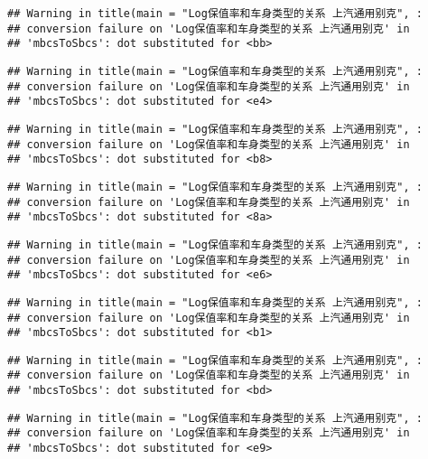 \documentclass[]{article}
\begin{document}
\begin{verbatim}
## Warning in title(main = "Log保值率和车身类型的关系 上汽通用别克", :
## conversion failure on 'Log保值率和车身类型的关系 上汽通用别克' in
## 'mbcsToSbcs': dot substituted for <bb>
\end{verbatim}

\begin{verbatim}
## Warning in title(main = "Log保值率和车身类型的关系 上汽通用别克", :
## conversion failure on 'Log保值率和车身类型的关系 上汽通用别克' in
## 'mbcsToSbcs': dot substituted for <e4>
\end{verbatim}

\begin{verbatim}
## Warning in title(main = "Log保值率和车身类型的关系 上汽通用别克", :
## conversion failure on 'Log保值率和车身类型的关系 上汽通用别克' in
## 'mbcsToSbcs': dot substituted for <b8>
\end{verbatim}

\begin{verbatim}
## Warning in title(main = "Log保值率和车身类型的关系 上汽通用别克", :
## conversion failure on 'Log保值率和车身类型的关系 上汽通用别克' in
## 'mbcsToSbcs': dot substituted for <8a>
\end{verbatim}

\begin{verbatim}
## Warning in title(main = "Log保值率和车身类型的关系 上汽通用别克", :
## conversion failure on 'Log保值率和车身类型的关系 上汽通用别克' in
## 'mbcsToSbcs': dot substituted for <e6>
\end{verbatim}

\begin{verbatim}
## Warning in title(main = "Log保值率和车身类型的关系 上汽通用别克", :
## conversion failure on 'Log保值率和车身类型的关系 上汽通用别克' in
## 'mbcsToSbcs': dot substituted for <b1>
\end{verbatim}

\begin{verbatim}
## Warning in title(main = "Log保值率和车身类型的关系 上汽通用别克", :
## conversion failure on 'Log保值率和车身类型的关系 上汽通用别克' in
## 'mbcsToSbcs': dot substituted for <bd>
\end{verbatim}

\begin{verbatim}
## Warning in title(main = "Log保值率和车身类型的关系 上汽通用别克", :
## conversion failure on 'Log保值率和车身类型的关系 上汽通用别克' in
## 'mbcsToSbcs': dot substituted for <e9>
\end{verbatim}
\end{document}
